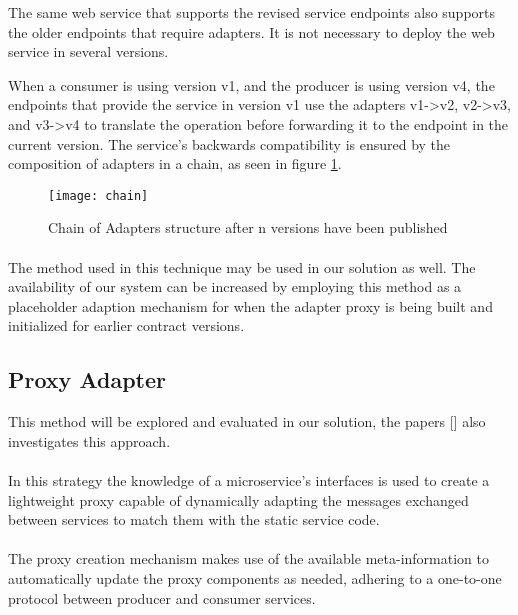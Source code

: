 The same web service that supports the revised service endpoints also supports the older endpoints that require adapters.
It is not necessary to deploy the web service in several versions.

When a consumer is using version v1, and the producer is using version v4, the endpoints that provide the service in version v1 use the adapters v1->v2, v2->v3, and v3->v4 to translate the operation before forwarding it to the endpoint in the current version.
The service's backwards compatibility is ensured by the composition of adapters in a chain, as seen in figure \ref{fig:chain}.

\begin{figure}[htbp]
    \centering
    \texttt{[image: chain]}
    \caption{Chain of Adapters structure
    after n versions have been published }
    \label{fig:chain}
\end{figure}

\paragraph{}

The method used in this technique may be used in our solution as well.
The availability of our system can be increased by employing this method as a
placeholder adaption mechanism for when the adapter proxy is being built and initialized for earlier contract versions.

\subsection{Proxy Adapter} %
\label{sec:proxy_adapter}

This method will be explored and evaluated in our solution, the papers [] also investigates this approach.

\paragraph{}

In this strategy the knowledge of a microservice’s
interfaces is used to create a lightweight proxy capable of dynamically adapting the messages exchanged between services to match them with the static service code.

\paragraph{}

The proxy creation mechanism makes use of the available meta-information
to automatically update the proxy components as needed, adhering to a one-to-one protocol between producer and consumer services.

